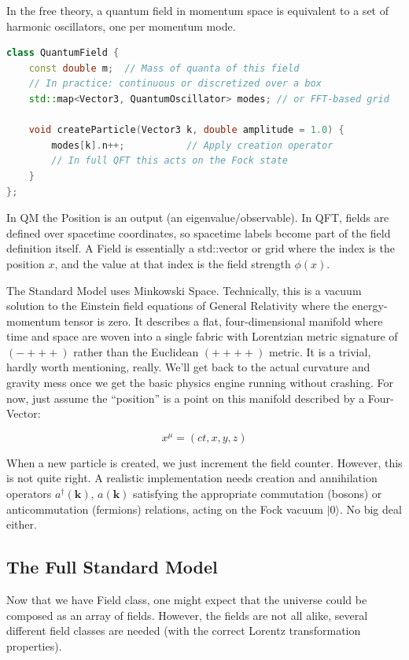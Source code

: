 In the free theory, a quantum field in momentum space is equivalent to a set of harmonic oscillators, one per momentum mode.

\begin{lstlisting}[language=C++, caption=Free Quantum Field (Momentum Space)]
class QuantumField {
    const double m;  // Mass of quanta of this field
    // In practice: continuous or discretized over a box
    std::map<Vector3, QuantumOscillator> modes; // or FFT-based grid

    void createParticle(Vector3 k, double amplitude = 1.0) {
        modes[k].n++;           // Apply creation operator
        // In full QFT this acts on the Fock state
    }
};
\end{lstlisting}

In QM the Position is an output (an eigenvalue/observable). In QFT, fields are defined over spacetime coordinates, so spacetime labels become part of the field definition itself.
A Field is essentially a std::vector or grid where the index is the position $x$, and the value at that index is the field strength $\phi(x)$.

The Standard Model uses Minkowski Space.
Technically, this is a vacuum solution to the Einstein field equations of General Relativity where the energy-momentum tensor is zero.
It describes a flat, four-dimensional manifold where time and space are woven into a single fabric with Lorentzian metric signature of $(-+++)$ rather than the Euclidean $(++++)$ metric.
It is a trivial, hardly worth mentioning, really.
We'll get back to the actual curvature and gravity mess once we get the basic physics engine running without crashing.
For now, just assume the ``position'' is a point on this manifold described by a Four-Vector:

\[
x^\mu = (ct, x, y, z)
\]

When a new particle is created, we just increment the field counter. However, this is not quite right.
A realistic implementation needs creation and annihilation operators $a^\dagger(\mathbf{k})$, $a(\mathbf{k})$ satisfying the appropriate commutation (bosons) or anticommutation (fermions) relations, acting on the Fock vacuum $|0\rangle$. No big deal either.


\subsection*{The Full Standard Model}

Now that we have Field class, one might expect that the universe could be composed
as an array of fields. However, the fields are not all alike, several different field classes
are needed (with the correct Lorentz transformation properties).


